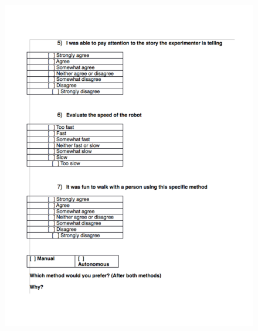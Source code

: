 \documentclass[12pt]{gatech-thesis}
\begin{document}
\begin{figure}[ht!]
\includegraphics[width=1.0\textwidth]{pics/telepresence_survey_1}
\end{figure}



 



\begin{postliminary}


\end{postliminary}

\end{document}
